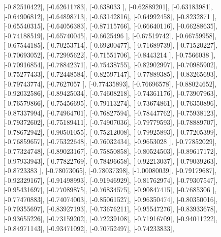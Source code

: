 \documentclass{article}
\begin{document}
       [-0.82510422],
       [-0.62611783],
       [-0.638033  ],
       [-0.62889201],
       [-0.63183981],
       [-0.64906812],
       [-0.64898713],
       [-0.63142816],
       [-0.64992458],
       [-0.8232871 ],
       [-0.65540315],
       [-0.64056383],
       [-0.87115766],
       [-0.66640116],
       [-0.66288635],
       [-0.74188519],
       [-0.65740045],
       [-0.6625496 ],
       [-0.67519742],
       [-0.66759958],
       [-0.67544185],
       [-0.70253714],
       [-0.69200477],
       [-0.71689739],
       [-0.71520227],
       [-0.70693052],
       [-0.72995622],
       [-0.71551706],
       [-0.8443214 ],
       [-0.7566038 ],
       [-0.70916854],
       [-0.78842371],
       [-0.75438755],
       [-0.82902997],
       [-0.70985902],
       [-0.75277433],
       [-0.72448584],
       [-0.82597147],
       [-0.77889385],
       [-0.83265693],
       [-0.79743774],
       [-0.7627057 ],
       [-0.77435893],
       [-0.76696578],
       [-0.88024652],
       [-0.92032586],
       [-0.89425034],
       [-0.74608218],
       [-0.74361176],
       [-0.73907963],
       [-0.76579866],
       [-0.75456695],
       [-0.79113274],
       [-0.73674861],
       [-0.76350896],
       [-0.87337994],
       [-0.74964701],
       [-0.76827594],
       [-0.78447762],
       [-0.75938123],
       [-0.79372602],
       [-0.75189411],
       [-0.74907036],
       [-0.79779593],
       [-0.78889707],
       [-0.78672942],
       [-0.90501055],
       [-0.75212008],
       [-0.79925893],
       [-0.77205399],
       [-0.76859657],
       [-0.75322648],
       [-0.76032434],
       [-0.9653028 ],
       [-0.77852029],
       [-0.77324748],
       [-0.89023167],
       [-0.75850858],
       [-0.80524503],
       [-0.89617172],
       [-0.97933943],
       [-0.77822769],
       [-0.78496658],
       [-0.92213037],
       [-0.79039263],
       [-0.8723383 ],
       [-0.78073065],
       [-0.78037398],
       [-1.00080039],
       [-0.79179687],
       [-0.92329167],
       [-0.91498993],
       [-0.91946929],
       [-0.81762974],
       [-0.79307547],
       [-0.95431697],
       [-0.77089875],
       [-0.76834575],
       [-0.90847415],
       [-0.7685306 ],
       [-0.77470883],
       [-0.74074003],
       [-0.85061527],
       [-0.96350474],
       [-0.80350016],
       [-0.79355697],
       [-0.83927193],
       [-0.73676211],
       [-0.95547276],
       [-0.83933678],
       [-0.93655226],
       [-0.73159202],
       [-0.72239108],
       [-0.71916709],
       [-0.94011222],
       [-0.84971143],
       [-0.93471092],
       [-0.70752497],
       [-0.74233833],
\end{document}
